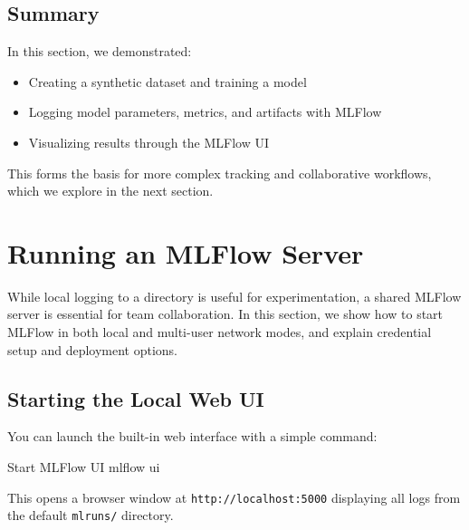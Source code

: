 %
\subsection{Summary}

In this section, we demonstrated:

\begin{itemize}
    \item Creating a synthetic dataset and training a model
    \item Logging model parameters, metrics, and artifacts with MLFlow
    \item Visualizing results through the MLFlow UI
\end{itemize}

This forms the basis for more complex tracking and collaborative workflows, which we explore in the next section.

%
\section{Running an MLFlow Server}

While local logging to a directory is useful for experimentation, a shared MLFlow server is essential for team collaboration. In this section, we show how to start MLFlow in both local and multi-user network modes, and explain credential setup and deployment options.

%
\subsection{Starting the Local Web UI}

You can launch the built-in web interface with a simple command:

\begin{codeonly}{Start MLFlow UI}
mlflow ui
\end{codeonly}

This opens a browser window at \texttt{http://localhost:5000} displaying all logs from the default \texttt{mlruns/} directory.

